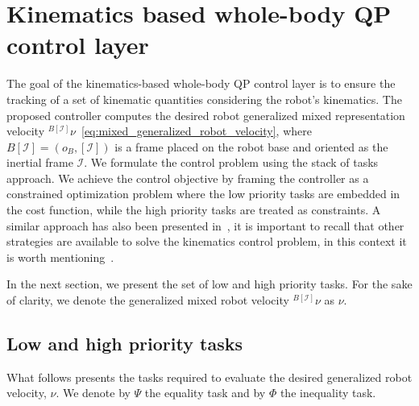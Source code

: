 \section{Kinematics based whole-body QP control layer\label{sec:ik_qp}}
The goal of the kinematics-based whole-body QP control layer is to ensure the tracking of a set of kinematic quantities considering the robot's kinematics. The proposed controller computes the desired robot generalized mixed representation velocity ${}^{B[\mathcal{I}]}\nu$~\eqref{eq:mixed_generalized_robot_velocity}, where $B[\mathcal{I}] = (o_B, [\mathcal{I}])$ is a frame placed on the robot base and oriented as the inertial frame $\mathcal{I}$.
 We formulate the control problem using the stack of tasks approach. We achieve the control objective by framing the controller as a constrained optimization problem where the low priority tasks are embedded in the cost function, while the high priority tasks are treated as constraints. A similar approach has also been presented in~\citep{Khudher2016QuadraticConstraints,Rapetti2020Model-BasedKinematics,Kanoun2011KinematicTask}, it is important to recall that other strategies are available to solve the kinematics control problem, in this context it is worth mentioning~\citep{Sciavicco1988,Goldenberg1985ARobots,Buss2005SelectivelyKinematics}.
\par
In the next section, we present the set of low and high priority tasks. For the sake of clarity, we denote the generalized mixed robot velocity ${}^{B[\mathcal{I}]}\nu$ as $\nu$.

\subsection{Low and high priority tasks\label{sec:ik_tasks}}
What follows presents the tasks required to evaluate the desired generalized robot velocity, $\nu$. We denote by $\Psi$ the equality task and by $\Phi$ the inequality task.

